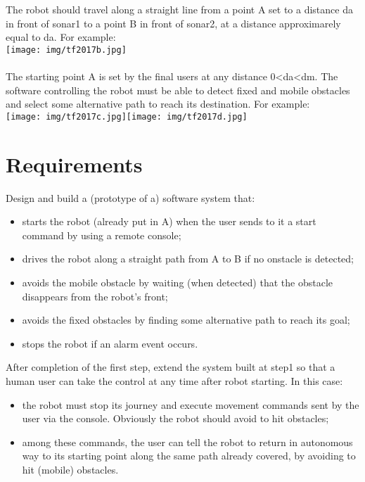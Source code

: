 \documentclass{llncs}
\newcommand{\labelsec}[1]{\label{sec:#1}}
\begin{document}
The robot should travel along a straight line from a point A set to a distance da in front of sonar1 to a point B in front of sonar2, at a distance approximarely equal to da. For example:\\
\texttt{[image: img/tf2017b.jpg]}\\ \\
The starting point A is set by the final users at any distance 0<da<dm. The software controlling the robot must be able to detect fixed and mobile obstacles and select some alternative path to reach its destination. For example:\\
\texttt{[image: img/tf2017c.jpg]}\texttt{[image: img/tf2017d.jpg]}

\section{Requirements}
\labelsec{Requirements}

Design and build a (prototype of a) software system that:
\begin{itemize}
\item starts the robot (already put in A) when the user sends to it a start command by using a remote console;
\item drives the robot along a straight path from A to B if no onstacle is detected;
\item avoids the mobile obstacle by waiting (when detected) that the obstacle disappears from the robot's front;
\item avoids the fixed obstacles by finding some alternative path to reach its goal;
\item stops the robot if an alarm event occurs.
\end{itemize}

After completion of the first step, extend the system built at step1 so that a human user can take the control at any time after robot starting. In this case:
\begin{itemize}
\item the robot must stop its journey and execute movement commands sent by the user via the console. Obviously the robot should avoid to hit obstacles;
\item among these commands, the user can tell the robot to return in autonomous way to its starting point along the same path already covered, by avoiding to hit (mobile) obstacles.
\end{itemize}
\end{document}
